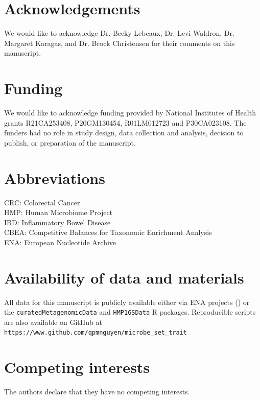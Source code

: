 \documentclass{bmcart}
\begin{document}
\clearpage
\begin{backmatter}

\section*{Acknowledgements}%
We would like to acknowledge Dr. Becky Lebeaux, Dr. Levi Waldron, Dr. Margaret Karagas, and Dr. Brock Christensen for their comments on this manuscript. 

\section*{Funding}%
We would like to acknowledge funding provided by National Institutes of Health grants R21CA253408, P20GM130454, R01LM012723 and P30CA023108. The funders had no role in study design, data collection and analysis, decision to publish, or preparation of the manuscript.

\section*{Abbreviations}%
CRC: Colorectal Cancer \\
HMP: Human Microbiome Project \\ 
IBD: Inflammatory Bowel Disease \\
CBEA: Competitive Balances for Taxonomic Enrichment Analysis \\
ENA: European Nucleotide Archive \\

\section*{Availability of data and materials}%
All data for this manuscript is publicly available either via ENA projects () or the \texttt{curatedMetagenomicData} and \texttt{HMP16SData} R packages. Reproducible scripts are also available on GitHub at \texttt{https://www.github.com/qpmnguyen/microbe\_set\_trait}

\section*{Competing interests}
The authors declare that they have no competing interests.


\end{backmatter}
\end{document}
